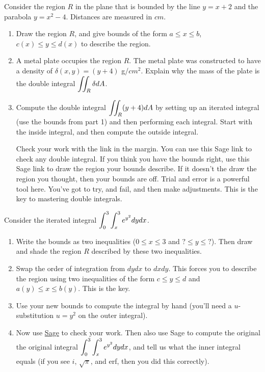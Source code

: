 \begin{problem}
Consider the region $R$ in the plane that is bounded by the line $y=x+2$ and the parabola $y=x^2-4$. Distances are measured in $cm$. 
\begin{enumerate}
 \item Draw the region $R$, and give bounds of the form $a\leq x\leq b$, $c(x)\leq y\leq d(x)$ to describe the region.
 \item A metal plate occupies the region $R$. The metal plate was constructed to have a density of $\delta (x,y)=(y+4)$ g/$cm^2$.  Explain why the mass of the plate is the double integral $\displaystyle\iint_R \delta dA$.  
 \item {}
Compute the double integral $\displaystyle\iint_R (y+4) dA$ by setting up an iterated integral (use the bounds from part 1) and then performing each integral. Start with the inside integral, and then compute the outside integral. 

Check your work with the link in the margin. You can use this Sage link to check any double integral. If you think you have the bounds right, use this Sage link to draw the region your bounds describe. If it doesn't the draw the region you thought, then your bounds are off. Trial and error is a powerful tool here.  You've got to try, and fail, and then make adjustments.  This is the key to mastering double integrals.
\end{enumerate}

\end{problem}


\begin{problem}
Consider the iterated integral $\displaystyle \int_0^3\int_x^3 e^{y^2}dydx$.
\begin{enumerate}
 \item Write the bounds as two inequalities ($0\leq x\leq 3$ and $?\leq y\leq ?$). Then draw and shade the region $R$ described by these two inequalities. 
 \item Swap the order of integration from $dydx$ to $dxdy$. This forces you to describe the region using two inequalities of the form $c\leq y\leq d$ and $a(y)\leq x\leq b(y)$. This is the key.
 \item Use your new bounds to compute the integral by hand (you'll need a $u$-substitution $u=y^2$ on the outer integral). 
 \item Now use \href{http://bmw.byuimath.com/dokuwiki/doku.php?id=double_integral_calculator}{Sage} to check your work. Then also use Sage to compute the original the original integral $\displaystyle \int_0^3\int_x^3 e^{y^2}dydx$, and tell us what the inner integral equals (if you see $i$, $\sqrt{\pi}$, and erf, then you did this correctly).
\end{enumerate}
\end{problem}

